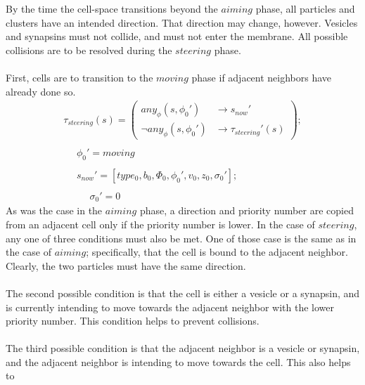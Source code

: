 \documentclass{acm_proc_article-sp}
\begin{document}
By the time the cell-space transitions beyond the $aiming$ phase, 
all particles and clusters have an intended direction.
That direction may change, however.  Vesicles and synapsins 
must not collide, and must not enter the membrane.  All
possible collisions are to be resolved during the $steering$
phase. \\
\\
First, cells are to transition to the $moving$ phase if 
adjacent neighbors have already done so.  
\begin{displaymath} \begin{array}{l}
\tau_{steering}(s) = \left( \begin{array}{ll} any_\phi(s, \phi_0')      & \rightarrow s_{now}' \\
                                              \neg any_\phi(s, \phi_0') & \rightarrow \tau_{steering}'(s) \end{array} \right); \\
\\
\hspace{16pt} \phi_0' = moving \\
\\
\hspace{16pt} s_{now}' = [type_0, b_0, \Phi_0, \phi_0', v_0, z_0, \sigma_0']; \\
\\
\hspace{16pt} \hspace{16pt} \sigma_0' = 0
\end{array} \end{displaymath}
As was the case in the $aiming$ phase, a direction and
priority number are copied from an adjacent cell only if
the priority number is lower.  In the case of $steering$,
any one of three conditions must also be met.  One of 
those case is the same as in the case of $aiming$; 
specifically, that the cell is bound to the adjacent 
neighbor.  Clearly, the two particles must have the
same direction. \\
\\
The second possible condition is that the cell is either
a vesicle or a synapsin, and is currently intending to 
move towards the adjacent neighbor with the lower priority
number.  This condition helps to prevent collisions. \\
\\
The third possible condition is that the adjacent neighbor
is a vesicle or synapsin, and the adjacent neighbor is 
intending to move towards the cell.  This also helps to 
\end{document}
